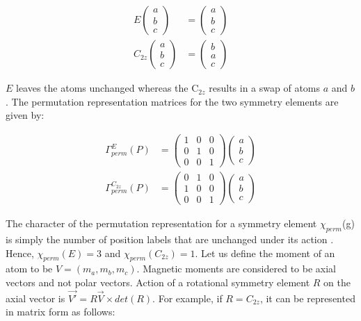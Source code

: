 \documentclass[10pt,doublespacing,edeposit]{uiucthesis2020}
\begin{document}
\begin{mainmatter}
\begin{align*}
E\begin{pmatrix}a\\b\\c\end{pmatrix} &= \begin{pmatrix}a\\b\\c\end{pmatrix} \\
C_{2z}\begin{pmatrix}a\\b\\c\end{pmatrix} &= \begin{pmatrix}b\\a\\c\end{pmatrix}
\end{align*}

$E$ leaves the atoms unchanged whereas the C$_{2z}$ results in a swap of atoms $a$ and $b$. The permutation representation matrices for the two symmetry elements are given by:

\begin{align*}
\Gamma_{perm}^E (P) &= \begin{pmatrix}1&0&0\\0&1&0\\0&0&1\end{pmatrix} \begin{pmatrix}a\\b\\c\end{pmatrix} \\
\Gamma_{perm}^{C_{2z}} (P) &= \begin{pmatrix}0&1&0\\1&0&0\\0&0&1\end{pmatrix} \begin{pmatrix}a\\b\\c\end{pmatrix}
\end{align*}

The character of the permutation representation for a symmetry element $\chi_{perm}$(g) is simply the number of position labels that are unchanged under its action \cite{Wills2001}. Hence, $\chi_{perm}(E) = 3$ and $\chi_{perm}(C_{2z}) = 1$. Let us define the moment of an atom to be $V = (m_a, m_b, m_c)$. Magnetic moments are considered to be axial vectors and not polar vectors. Action of a rotational symmetry element  $R$ on the axial vector is $\vec{V'} = R\vec{V} \times det(R)$. For example, if $R = C_{2z}$, it can be represented in matrix form as follows:


\end{mainmatter}
\end{document}
